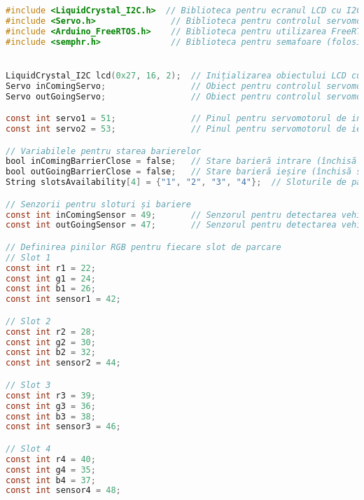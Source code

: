 \documentclass[a4paper,11pt]{report}
\begin{document}
\noindent
\small
{}
\begin{lstlisting}[language=C]
#include <LiquidCrystal_I2C.h>  // Biblioteca pentru ecranul LCD cu I2C
#include <Servo.h>               // Biblioteca pentru controlul servomotoarelor
#include <Arduino_FreeRTOS.h>    // Biblioteca pentru utilizarea FreeRTOS (multithreading)
#include <semphr.h>              // Biblioteca pentru semafoare (folosită pentru sincronizare)


LiquidCrystal_I2C lcd(0x27, 16, 2);  // Inițializarea obiectului LCD cu adresa 0x27, 16 coloane și 2 linii
Servo inComingServo;                 // Obiect pentru controlul servomotorului barieră de intrare
Servo outGoingServo;                 // Obiect pentru controlul servomotorului barieră de ieșire

const int servo1 = 51;               // Pinul pentru servomotorul de intrare
const int servo2 = 53;               // Pinul pentru servomotorul de ieșire

// Variabilele pentru starea barierelor
bool inComingBarrierClose = false;   // Stare barieră intrare (închisă sau deschisă)
bool outGoingBarrierClose = false;   // Stare barieră ieșire (închisă sau deschisă)
String slotsAvailability[4] = {"1", "2", "3", "4"};  // Sloturile de parcare disponibile (1 - disponibil, - - ocupat)

// Senzorii pentru sloturi și bariere
const int inComingSensor = 49;       // Senzorul pentru detectarea vehiculului la intrare
const int outGoingSensor = 47;       // Senzorul pentru detectarea vehiculului la ieșire

// Definirea pinilor RGB pentru fiecare slot de parcare
// Slot 1
const int r1 = 22;
const int g1 = 24;
const int b1 = 26;
const int sensor1 = 42;

// Slot 2
const int r2 = 28;
const int g2 = 30;
const int b2 = 32;
const int sensor2 = 44;

// Slot 3
const int r3 = 39;
const int g3 = 36;
const int b3 = 38;
const int sensor3 = 46;

// Slot 4
const int r4 = 40;
const int g4 = 35;
const int b4 = 37;
const int sensor4 = 48;


\end{lstlisting}
\end{document}
